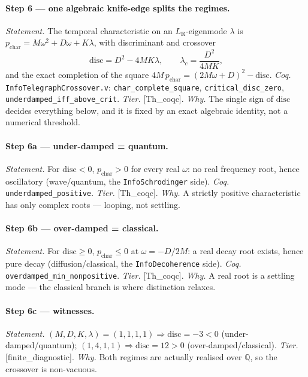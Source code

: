\documentclass[10pt,twocolumn]{article}
\theoremstyle{definition}
\newcommand{\Thq}{\textsf{[Th\_coqc]}}   %
\newcommand{\Fin}{\textsf{[finite\_diagnostic]}} %
\newcommand{\code}[1]{\texttt{#1}}
\newcommand{\LR}{L_{\mathrm R}}
\begin{document}
\paragraph{Step 6 --- one algebraic knife-edge splits the regimes.}
\emph{Statement.} The temporal characteristic on an $\LR$-eigenmode $\lambda$ is
$p_{\mathrm{char}}=M\omega^2+D\omega+K\lambda$, with discriminant and crossover
\[
  \mathrm{disc}=D^2-4MK\lambda,\qquad \lambda_c=\frac{D^2}{4MK},
\]
and the exact completion of the square $4M\,p_{\mathrm{char}}=(2M\omega+D)^2-\mathrm{disc}$.
\emph{Coq.} \code{InfoTelegraphCrossover.v}: \code{char\_complete\_square},
\code{critical\_disc\_zero}, \code{underdamped\_iff\_above\_crit}. \emph{Tier.}
\Thq{}. \emph{Why.} The single sign of $\mathrm{disc}$ decides everything below,
and it is fixed by an exact algebraic identity, not a numerical threshold.

\paragraph{Step 6a --- under-damped = quantum.}
\emph{Statement.} For $\mathrm{disc}<0$, $p_{\mathrm{char}}>0$ for every real
$\omega$: no real frequency root, hence oscillatory (wave/quantum, the
\code{InfoSchrodinger} side). \emph{Coq.} \code{underdamped\_positive}.
\emph{Tier.} \Thq{}. \emph{Why.} A strictly positive characteristic has only
complex roots --- looping, not settling.

\paragraph{Step 6b --- over-damped = classical.}
\emph{Statement.} For $\mathrm{disc}\ge 0$, $p_{\mathrm{char}}\le 0$ at
$\omega=-D/2M$: a real decay root exists, hence pure decay (diffusion/classical,
the \code{InfoDecoherence} side). \emph{Coq.}
\code{overdamped\_min\_nonpositive}. \emph{Tier.} \Thq{}. \emph{Why.} A real
root is a settling mode --- the classical branch is where distinction relaxes.

\paragraph{Step 6c --- witnesses.}
\emph{Statement.} $(M,D,K,\lambda)=(1,1,1,1)\Rightarrow\mathrm{disc}=-3<0$
(under-damped/quantum); $(1,4,1,1)\Rightarrow\mathrm{disc}=12>0$
(over-damped/classical). \emph{Tier.} \Fin{}. \emph{Why.} Both regimes are
actually realised over $\mathbb{Q}$, so the crossover is non-vacuous.
\end{document}
